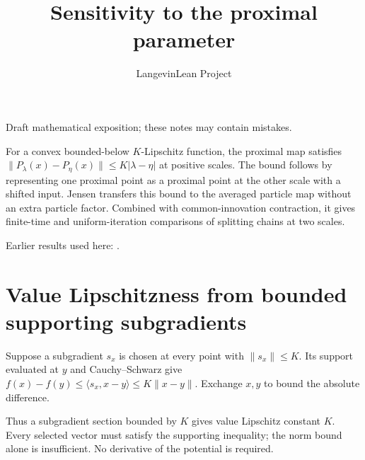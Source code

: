 \documentclass[11pt,a4paper]{article}
\title{\texorpdfstring{Sensitivity to the proximal parameter}{Sensitivity to the proximal parameter}}
\author{LangevinLean Project}
\date{}
\begin{document}
\maketitle
Draft mathematical exposition; these notes may contain mistakes.


For a convex bounded-below \(K\)-Lipschitz function, the proximal map satisfies \(\|P_\lambda(x)-P_\eta(x)\|\le K|\lambda-\eta|\) at positive scales. The bound follows by representing one proximal point as a proximal point at the other scale with a shifted input. Jensen transfers this bound to the averaged particle map without an extra particle factor. Combined with common-innovation contraction, it gives finite-time and uniform-iteration comparisons of splitting chains at two scales.



Earlier results used here: \cite[Section~3.15]{LangevinLean2026ULASC}.

\section{\texorpdfstring{Value Lipschitzness from bounded supporting subgradients}{Value Lipschitzness from bounded supporting subgradients}}


Suppose a subgradient \(s_x\) is chosen at every point with \(\|s_x\|\le K\). Its support evaluated at \(y\) and Cauchy–Schwarz give \(f(x)-f(y)\le\langle s_x,x-y\rangle\le K\|x-y\|\). Exchange \(x,y\) to bound the absolute difference.



Thus a subgradient section bounded by \(K\) gives value Lipschitz constant \(K\). Every selected vector must satisfy the supporting inequality; the norm bound alone is insufficient. No derivative of the potential is required.
\end{document}
